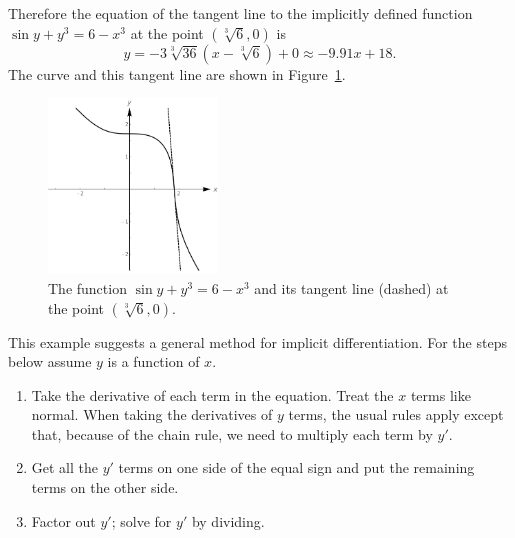 \begin{example}
Therefore the equation of the tangent line to the implicitly defined function $\sin y + y^3=6-x^3$ at the point $(\sqrt[3]{6},0)$ is $$y = -3\sqrt[3]{36}(x-\sqrt[3]{6})+0 \approx -9.91x+18.$$ The curve and this tangent line are shown in Figure~\ref{fig_diff_7}.

\begin{figure}[H]
	\begin{center}
			\includegraphics[width=0.4\textwidth]{fig_diff_7}
	\caption{The function $\sin y+y^3 = 6-x^3$ and its tangent line (dashed) at the point $(\sqrt[3]{6},0)$.}
	\label{fig_diff_7}
	\end{center}
\end{figure}

\end{example}

This example suggests a general method for implicit differentiation.  For the steps below assume $y$ is a function of $x$.
\begin{enumerate}
\item Take the derivative of each term in the equation.  Treat the $x$ terms like normal.  When taking the derivatives of $y$ terms, the usual rules apply except that, because of the chain rule, we need to multiply each term by $y'$.
\item Get all the $y'$ terms on one side of the equal sign and put the remaining terms on the other side.
\item Factor out $y'$;  solve for $y'$ by dividing.
\end{enumerate}


